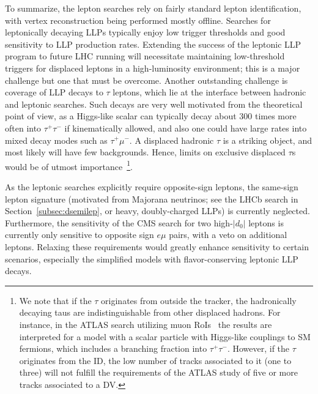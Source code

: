 To summarize, the lepton searches rely on fairly standard lepton identification, with vertex reconstruction being performed mostly offline. Searches for leptonically decaying LLPs typically enjoy low trigger thresholds and good sensitivity to LLP production rates. Extending the success of the leptonic LLP program to future LHC running will necessitate maintaining low-threshold triggers for displaced leptons in a high-luminosity environment; this is a major challenge but one that must be overcome. Another outstanding challenge is coverage of LLP decays to $\tau$ leptons, which lie at the interface between hadronic and leptonic searches. Such decays are very well motivated from the theoretical point of view, as a Higgs-like scalar can typically decay about 300 times more often into $\tau^+ \tau^-$ if kinematically allowed, and also one could have large rates into mixed decay modes such as $\tau^+ \mu^-$. A displaced hadronic $\tau$ is a striking object, and most likely will have few backgrounds. Hence, limits on exclusive displaced $\tau$s would be of utmost importance~\footnote{We note that if the $\tau$ originates from outside the tracker, the hadronically decaying taus are indistinguishable from other displaced hadrons. For instance, in the ATLAS search utilizing muon RoIs~\cite{Aad:2015uaa} the results are interpreted for a model with a scalar particle with Higgs-like couplings to SM fermions, which includes a branching fraction into $\tau^+ \tau^-$. However, if the $\tau$ originates from the ID, the low number of tracks associated to it (one to three) will not fulfill the requirements of the ATLAS study of five or more tracks associated to a DV.}.

As the leptonic searches explicitly require opposite-sign leptons, the same-sign lepton signature (motivated from Majorana neutrinos; see the LHCb search in Section~\ref{subsec:dsemilep}, or heavy, doubly-charged LLPs) is currently neglected. Furthermore, the sensitivity of the CMS search for two high-$|d_0|$ leptons is currently only sensitive to opposite sign $e\mu$ pairs, with a veto on additional leptons. Relaxing these requirements would greatly enhance sensitivity to certain scenarios, especially the simplified models with flavor-conserving leptonic LLP decays.

